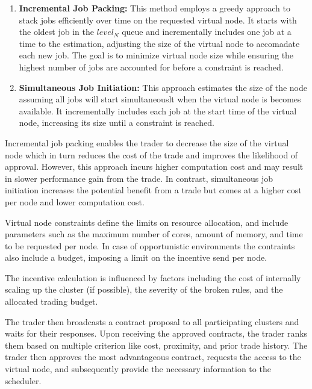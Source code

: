 \begin{enumerate}

  \item \textbf{Incremental Job Packing:} This method employs a greedy approach
    to stack jobs efficiently over time on the requested virtual node. It
    starts with the oldest job in the $level_N$ queue and incrementally
    includes one job at a time to the estimation, adjusting the size of the
    virtual node to accomadate each new job. The goal is to minimize virtual
    node size while ensuring the highest number of jobs are accounted for
    before a constraint is reached.

  \item \textbf{Simultaneous Job Initiation:} This approach estimates the size
    of the node assuming all jobs will start simultaneouslt when the virtual
    node is becomes available. It incrementally includes each job at the start
    time of the virtual node, increasing its size until a constraint is
    reached. 

\end{enumerate}

Incremental job packing enables the trader to decrease the size of the virtual
node which in turn reduces the cost of the trade and improves the likelihood of
approval. However, this approach incurs higher computation cost and may result
in slower performance gain from the trade. In contrast, simultaneous job
initiation increases the potential benefit from a trade but comes at a higher
cost per node and lower computation cost.

Virtual node constraints define the limits on resource allocation, and include
parameters such as the maximum number of cores, amount of memory, and time to
be requested per node. In case of opportunistic environments the contraints
also include a budget, imposing a limit on the incentive send per node.


The incentive calculation is influenced by factors including the cost of
internally scaling up the cluster (if possible), the severity of the broken 
rules, and the allocated trading budget.

The trader then broadcasts a contract proposal to all participating clusters
and waits for their responses. Upon receiving the approved contracts, the
trader ranks them based on multiple criterion like cost, proximity, and prior
trade history. The trader then approves the most advantageous contract,
requests the access to the virtual node, and subsequently provide the necessary
information to the scheduler.

